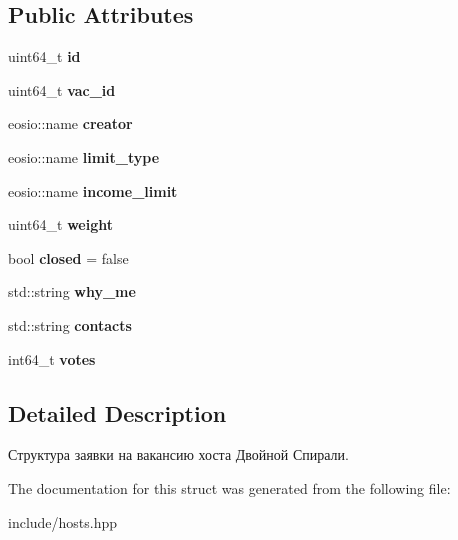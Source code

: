\subsection*{Public Attributes}
\begin{DoxyCompactItemize}
\item 
\mbox{\label{structvproposal_a2256401ab4ef42873de7d421ebdda8d2}} 
uint64\+\_\+t {\bfseries id}
\item 
\mbox{\label{structvproposal_ab50453667543dd87a6322b23465a1c82}} 
uint64\+\_\+t {\bfseries vac\+\_\+id}
\item 
\mbox{\label{structvproposal_a33b76d80622c5b1240b4648dc8853736}} 
eosio\+::name {\bfseries creator}
\item 
\mbox{\label{structvproposal_a8842ccf178234200fafd9fe1a05b5d77}} 
eosio\+::name {\bfseries limit\+\_\+type}
\item 
\mbox{\label{structvproposal_a556c2c05b8a28dd3b25000a9ad64ecea}} 
eosio\+::name {\bfseries income\+\_\+limit}
\item 
\mbox{\label{structvproposal_a001c700627f80f5437cf4b24aa00d49f}} 
uint64\+\_\+t {\bfseries weight}
\item 
\mbox{\label{structvproposal_a26964a820d84cff45449069c1d5d0fd0}} 
bool {\bfseries closed} = false
\item 
\mbox{\label{structvproposal_a8d187e3700848b2b6d78e6c2e3a01b2c}} 
std\+::string {\bfseries why\+\_\+me}
\item 
\mbox{\label{structvproposal_a60b006e66f1ecb7ab8dae173e5d5970b}} 
std\+::string {\bfseries contacts}
\item 
\mbox{\label{structvproposal_af50598bc4dd264f992d89c381229872b}} 
int64\+\_\+t {\bfseries votes}
\end{DoxyCompactItemize}


\subsection{Detailed Description}
Структура заявки на вакансию хоста Двойной Спирали. 

The documentation for this struct was generated from the following file\+:\begin{DoxyCompactItemize}
\item 
include/hosts.\+hpp\end{DoxyCompactItemize}

